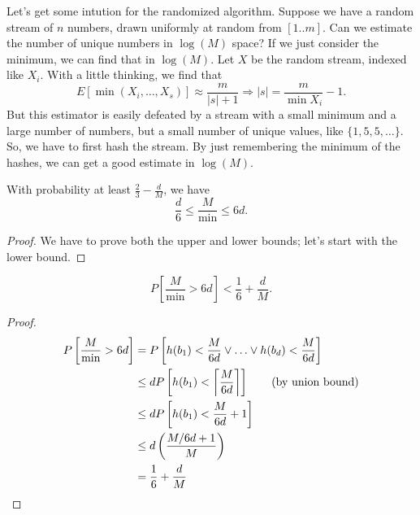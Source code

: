 \documentclass{notes}
\begin{document}
Let's get some intution for the randomized algorithm. Suppose we have a random stream of $n$ numbers, drawn uniformly at random 
from $[1..m]$. Can we estimate the number of unique numbers in $\log(M)$ space? If we just consider 
the minimum, we can find that in $\log(M)$. Let $X$ be the random stream, indexed like $X_i$.
With a little thinking, we find that $$E[\min(X_i,\ldots,X_s)] \approx \frac{m}{|s| + 1} \Rightarrow
|s| = \frac{m}{\min{X_i}} - 1.$$ But this estimator is easily defeated by a stream with a small minimum
and a large number of numbers, but a small number of unique values, like $\{1, 5, 5, \ldots \}$. So,
we have to first hash the stream. By just remembering the minimum of the hashes, we can get a good estimate
in $\log(M)$. \\

\begin{theorem}
  With probability at least $\frac{2}{3} - \frac{d}{M}$, we have $$\frac{d}{6}\leq\frac{M}{\min}\leq
  6d.$$
\end{theorem}
\begin{proof}
  We have to prove both the upper and lower bounds; let's start with the lower bound.
\end{proof}

\begin{lemma}
  $$P\left[\frac{M}{\min} > 6d\right] < \frac{1}{6} + \frac{d}{M}.$$
\end{lemma}
\begin{proof}
  \begin{align*}
    P\left[\frac{M}{\min} > 6d\right] &= P\left[h(b_1) < \frac{M}{6d} \vee \ldots \vee h(b_d) < \frac{M}{6d}\right] \\
                                      &\leq dP\left[h(b_1) < \ceil*{\frac{M}{6d}}\right] \note{(by union bound)} \\
                                      &\leq dP\left[h(b_1) < \frac{M}{6d} + 1\right] \\
                                      &\leq d\left(\frac{M/6d + 1}{M}\right) \\
                                      &= \frac{1}{6} + \frac{d}{M}
  \end{align*}
\end{proof}
\end{document}
